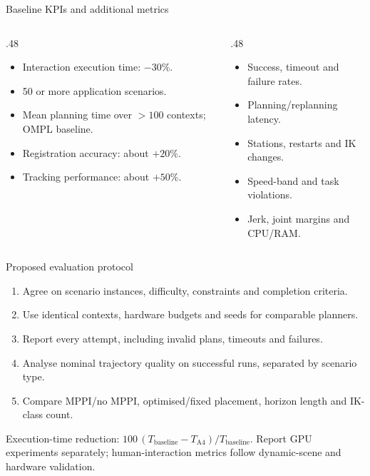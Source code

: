 \documentclass[aspectratio=169,10pt]{beamer}
\begin{document}
\begin{frame}{Baseline KPIs and additional metrics}
\begin{columns}[T]
\begin{column}{.48\textwidth}
\begin{itemize}\items
\item Interaction execution time: $-30\%$.
\item 50 or more application scenarios.
\item Mean planning time over $>100$ contexts; OMPL baseline.
\item Registration accuracy: about $+20\%$.\item Tracking performance: about $+50\%$.
\end{itemize}
\end{column}
\begin{column}{.48\textwidth}
\begin{itemize}\items
\item Success, timeout and failure rates.
\item Planning/replanning latency.
\item Stations, restarts and IK changes.
\item Speed-band and task violations.
\item Jerk, joint margins and CPU/RAM.
\end{itemize}
\end{column}
\end{columns}
\end{frame}

\begin{frame}{Proposed evaluation protocol}
\begin{enumerate}\items
\item Agree on scenario instances, difficulty, constraints and completion criteria.
\item Use identical contexts, hardware budgets and seeds for comparable planners.
\item Report every attempt, including invalid plans, timeouts and failures.
\item Analyse nominal trajectory quality on successful runs, separated by scenario type.
\item Compare MPPI/no MPPI, optimised/fixed placement, horizon length and IK-class count.
\end{enumerate}
\small
Execution-time reduction: $100\,(T_{\mathrm{baseline}}-T_{\mathrm{A4}})/T_{\mathrm{baseline}}$. Report GPU experiments separately; human-interaction metrics follow dynamic-scene and hardware validation.
\end{frame}
\end{document}
